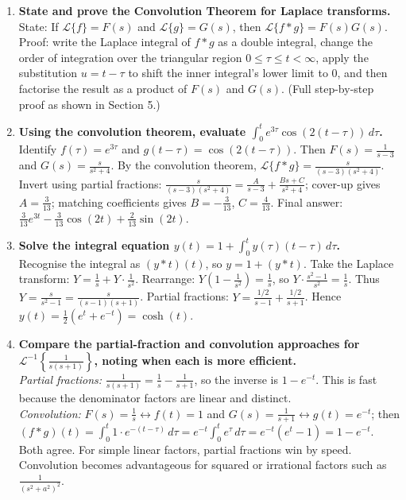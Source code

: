 \documentclass[12pt,a4paper]{article}
\begin{document}
\begin{enumerate}[label=\textbf{\arabic*.}, leftmargin=*, itemsep=10pt]

\item \textbf{State and prove the Convolution Theorem for Laplace transforms.}\\
State: If $\mathcal{L}\{f\}=F(s)$ and $\mathcal{L}\{g\}=G(s)$, then $\mathcal{L}\{f*g\}=F(s)G(s)$.
Proof: write the Laplace integral of $f*g$ as a double integral, change the order of
integration over the triangular region $0\le\tau\le t<\infty$, apply the substitution
$u=t-\tau$ to shift the inner integral's lower limit to $0$, and then factorise the result
as a product of $F(s)$ and $G(s)$.
(Full step-by-step proof as shown in Section 5.)

\item \textbf{Using the convolution theorem, evaluate
$\displaystyle\int_0^t e^{3\tau}\cos(2(t-\tau))\,d\tau$.}\\
Identify $f(\tau)=e^{3\tau}$ and $g(t-\tau)=\cos(2(t-\tau))$.
Then $F(s)=\frac{1}{s-3}$ and $G(s)=\frac{s}{s^2+4}$.
By the convolution theorem, $\mathcal{L}\{f*g\}=\frac{s}{(s-3)(s^2+4)}$.
Invert using partial fractions:
$\frac{s}{(s-3)(s^2+4)}=\frac{A}{s-3}+\frac{Bs+C}{s^2+4}$;
cover-up gives $A=\frac{3}{13}$; matching coefficients gives $B=-\frac{3}{13}$, $C=\frac{4}{13}$.
Final answer: $\frac{3}{13}e^{3t}-\frac{3}{13}\cos(2t)+\frac{2}{13}\sin(2t)$.

\item \textbf{Solve the integral equation $y(t)=1+\int_0^t y(\tau)(t-\tau)\,d\tau$.}\\
Recognise the integral as $(y*t)(t)$, so $y=1+(y*t)$.
Take the Laplace transform: $Y=\frac{1}{s}+Y\cdot\frac{1}{s^2}$.
Rearrange: $Y(1-\frac{1}{s^2})=\frac{1}{s}$, so $Y\cdot\frac{s^2-1}{s^2}=\frac{1}{s}$.
Thus $Y=\frac{s}{s^2-1}=\frac{s}{(s-1)(s+1)}$.
Partial fractions: $Y=\frac{1/2}{s-1}+\frac{1/2}{s+1}$.
Hence $y(t)=\frac{1}{2}(e^{t}+e^{-t})=\cosh(t)$.

\item \textbf{Compare the partial-fraction and convolution approaches for
$\mathcal{L}^{-1}\!\left\{\frac{1}{s(s+1)}\right\}$, noting when each is more efficient.}\\
\textit{Partial fractions:} $\frac{1}{s(s+1)}=\frac{1}{s}-\frac{1}{s+1}$, so the inverse is
$1-e^{-t}$. This is fast because the denominator factors are linear and distinct.\\
\textit{Convolution:} $F(s)=\frac{1}{s}\leftrightarrow f(t)=1$ and
$G(s)=\frac{1}{s+1}\leftrightarrow g(t)=e^{-t}$; then
$(f*g)(t)=\int_0^t 1\cdot e^{-(t-\tau)}\,d\tau=e^{-t}\int_0^t e^\tau\,d\tau=e^{-t}(e^{t}-1)=1-e^{-t}$.
Both agree. For simple linear factors, partial fractions win by speed. Convolution becomes
advantageous for squared or irrational factors such as $\frac{1}{(s^2+a^2)^2}$.


\end{enumerate}
\end{document}
